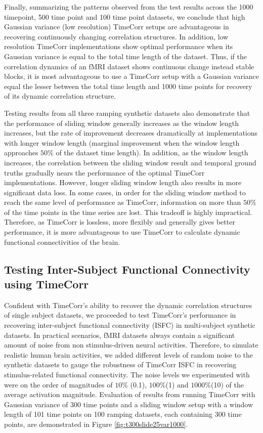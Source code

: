 \documentclass[11pt]{article}
\begin{document}
\begin{enumerate}
Finally, summarizing the patterns observed from the test results across the 1000 timepoint, 500 time point and 100 time point datasets, we conclude that high Gaussian variance (low resolution) TimeCorr setups are advantageous in recovering continuously changing correlation structures. In addition, low resolution TimeCorr implementations show optimal performance when its Gaussian variance is equal to the total time length of the dataset. Thus, if the correlation dynamics of an fMRI dataset shows continuous change instead stable blocks, it is most advantageous to use a TimeCorr setup with a Gaussian variance equal the lesser between the total time length and 1000 time points for recovery of its dynamic correlation structure.

Testing results from all three ramping synthetic datasets also demonstrate that the performance of sliding window generally increases as the window length increases, but the rate of improvement decreases dramatically at implementations with longer window length (marginal improvement when the window length approaches $50\%$ of the dataset time length). In addition, as the window length increases, the correlation between the sliding window result and temporal ground truths gradually nears the performance of the optimal TimeCorr implementations. However, longer sliding window length also results in more significant data loss. In some cases, in order for the sliding window method to reach the same level of performance as TimeCorr, information on more than $50\%$ of the time points in the time series are lost. This tradeoff is highly impractical. Therefore, as TimeCorr is lossless, more flexibly and generally gives better performance, it is more advantageous to use TimeCorr to calculate dynamic functional connectivities of the brain.

\subsection{Testing Inter-Subject Functional Connectivity using TimeCorr}
Confident with TimeCorr's ability to recover the dynamic correlation structures of single subject datasets, we proceeded to test TimeCorr's performance in recovering inter-subject functional connectivity (ISFC) in multi-subject synthetic datasets. In practical scenarios, fMRI datasets always contain a significant amount of noise from non stimulus-driven neural activities. Therefore, to simulate realistic human brain activities, we added different levels of random noise to the synthetic datasets to gauge the robustness of TimeCorr ISFC in recovering stimulus-related functional connectivity. The noise levels we experimented with were on the order of magnitudes of $10\%$ (0.1), $100\%$(1) and $1000\%$(10) of the average activation magnitude. Evaluation of results from running TimeCorr with Gaussian variance of 300 time points and a sliding window setup with a window length of 101 time points on 100 ramping datasets, each containing 300 time points, are demonstrated in Figure \ref{fig:t300slide25var1000}.


\end{enumerate}
\end{document}
